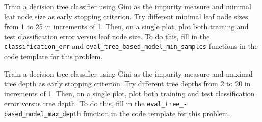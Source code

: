 \indent\problem[7] %
Train a decision tree classifier using Gini as the impurity measure and minimal leaf
node size as early stopping criterion. Try different minimal leaf node sizes from 1 to 25 in increments of 1. Then, on a single plot, plot both training and test classification error versus leaf node size. To do this, fill in the \texttt{classification_err} and \texttt{eval_tree_based_model_min_samples} functions in the code template for this problem.
\begin{solution}\end{solution}
\newpage


\problem[7] Train a decision tree classifier using Gini as the impurity measure and maximal tree
depth as early stopping criterion. Try different tree depths from 2 to 20 in increments of 1. Then, on a single plot, plot both training and test classification error versus tree depth. To do this, fill in the \texttt{eval_tree_-based_model_max_depth} function in the code template for this problem.
\begin{solution}\end{solution}
\newpage



